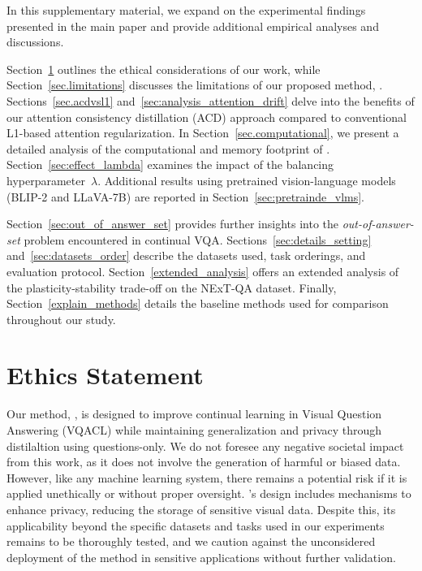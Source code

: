 \clearpage
\setcounter{page}{1}
\maketitlesupplementary

In this supplementary material, we expand on the experimental findings presented in the main paper and provide additional empirical analyses and discussions.

Section~\ref{sec.ethics} outlines the ethical considerations of our work, while Section~\ref{sec.limitations} discusses the limitations of our proposed method, \qstmethodshort{}. Sections~\ref{sec.acdvsl1} and~\ref{sec:analysis_attention_drift} delve into the benefits of our attention consistency distillation (ACD) approach compared to conventional L1-based attention regularization. In Section~\ref{sec.computational}, we present a detailed analysis of the computational and memory footprint of \qstmethodshort{}. Section~\ref{sec:effect_lambda} examines the impact of the balancing hyperparameter~$\lambda$. Additional results using pretrained vision-language models (BLIP-2 and LLaVA-7B) are reported in Section~\ref{sec:pretrainde_vlms}.

Section~\ref{sec:out_of_answer_set} provides further insights into the \textit{out-of-answer-set} problem encountered in continual VQA. Sections~\ref{sec:details_setting} and~\ref{sec:datasets_order} describe the datasets used, task orderings, and evaluation protocol. Section~\ref{extended_analysis} offers an extended analysis of the plasticity-stability trade-off on the NExT-QA dataset. Finally, Section~\ref{explain_methods} details the baseline methods used for comparison throughout our study.

\section{Ethics Statement}
\label{sec.ethics}
Our method, \qstmethodshort{}, is designed to improve continual learning in Visual Question Answering (VQACL) while maintaining generalization and privacy through distilaltion using questions-only. We do not foresee any negative societal impact from this work, as it does not involve the generation of harmful or biased data. However, like any machine learning system, there remains a potential risk if it is applied unethically or without proper oversight. \qstmethodshort{}'s design includes mechanisms to enhance privacy, reducing the storage of sensitive visual data. Despite this, its applicability beyond the specific datasets and tasks used in our experiments remains to be thoroughly tested, and we caution against the unconsidered deployment of the method in sensitive applications without further validation.

